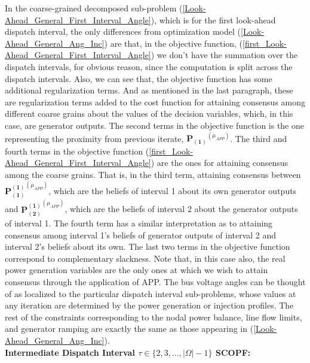 \documentclass[preprint,12pt,3p]{elsarticle}
\begin{document}
In the coarse-grained decomposed sub-problem (\ref{Look-Ahead_General_First_Interval_Angle}), which is for the first look-ahead dispatch interval, the only differences from optimization model (\ref{Look-Ahead_General_Ang_Inc}) are that, in the objective function, (\ref{first_Look-Ahead_General_First_Interval_Angle}) we don't have the summation over the dispatch intervals, for obvious reason, since the computation is split across the dispatch intervals. Also, we can see that, the objective function has some additional regularization terms. And as mentioned in the last paragraph, these are regularization terms added to the cost function for attaining consensus among different coarse grains about the values of the decision variables, which, in this case, are generator outputs. The second terms in the objective function is the one representing the proximity from previous iterate, $\mathbf{P_{(1)}}^{(\mu_{APP})}$. The third and fourth terms in the objective function (\ref{first_Look-Ahead_General_First_Interval_Angle}) are the ones for attaining consensus among the coarse grains. That is, in the third term, attaining consensus between $\mathbf{P_{(1)}^{(1)}}^{(\mu_{APP})}$, which are the beliefs of interval 1 about its own generator outputs and $\mathbf{P_{(2)}^{(1)}}^{(\mu_{APP})}$, which are the beliefs of interval 2 about the generator outputs of interval 1.  The fourth term has a similar interpretation as to attaining consensus among interval 1's beliefs of generator outputs of interval 2 and interval 2's beliefs about its own. The last two terms in the objective function correspond to complementary slackness. Note that, in this case also, the real power generation variables are the only ones at which we wish to attain consensus through the application of APP. The bus voltage angles can be thought of as localized to the particular dispatch interval sub-problems, whose values at any iteration are determined by the power generation or injection profiles. The rest of the constraints corresponding to the nodal power balance, line flow limits, and generator ramping are exactly the same as those appearing in (\ref{Look-Ahead_General_Ang_Inc}).\\
\textbf{Intermediate Dispatch Interval $\tau \in \{2,3,...,|\Omega|-1\}$ SCOPF:}
\end{document}
